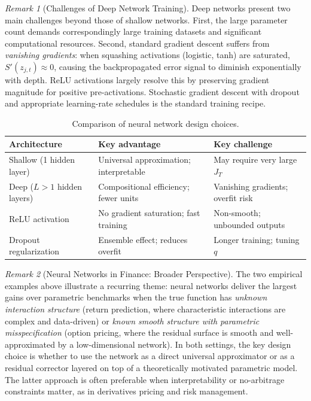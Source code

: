 \documentclass[11pt]{article}
\theoremstyle{definition}
\theoremstyle{plain}
\theoremstyle{remark}
\newtheorem{remark}{Remark}[section]
\begin{document}
\begin{remark}[Challenges of Deep Network Training]
    Deep networks present two main challenges beyond those of shallow networks. First, the large parameter count demands correspondingly large training datasets and significant computational resources. Second, standard gradient descent suffers from \emph{vanishing gradients}: when squashing activations (logistic, tanh) are saturated, $S'(z_{j,t}) \approx 0$, causing the backpropagated error signal to diminish exponentially with depth. ReLU activations largely resolve this by preserving gradient magnitude for positive pre-activations. Stochastic gradient descent with dropout and appropriate learning-rate schedules is the standard training recipe.
\end{remark}

\begin{table}[H]
\centering
\renewcommand{\arraystretch}{1.3}
\begin{tabular}{@{}lll@{}}
\toprule
\textbf{Architecture} & \textbf{Key advantage} & \textbf{Key challenge} \\
\midrule
Shallow (1 hidden layer) & Universal approximation; interpretable & May require very large $J_T$ \\
Deep ($L > 1$ hidden layers) & Compositional efficiency; fewer units & Vanishing gradients; overfit risk \\
ReLU activation & No gradient saturation; fast training & Non-smooth; unbounded outputs \\
Dropout regularization & Ensemble effect; reduces overfit & Longer training; tuning $q$ \\
\bottomrule
\end{tabular}
\caption{Comparison of neural network design choices.}
\end{table}

\begin{remark}[Neural Networks in Finance: Broader Perspective]
    The two empirical examples above illustrate a recurring theme: neural networks deliver the largest gains over parametric benchmarks when the true function has \emph{unknown interaction structure} (return prediction, where characteristic interactions are complex and data-driven) or \emph{known smooth structure with parametric misspecification} (option pricing, where the residual surface is smooth and well-approximated by a low-dimensional network). In both settings, the key design choice is whether to use the network as a direct universal approximator or as a residual corrector layered on top of a theoretically motivated parametric model. The latter approach is often preferable when interpretability or no-arbitrage constraints matter, as in derivatives pricing and risk management.
\end{remark}
\end{document}
